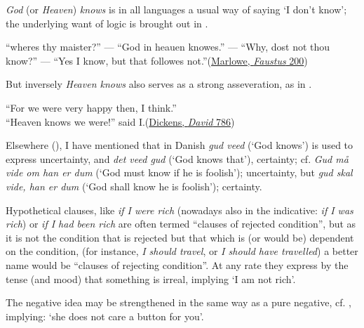 \textit{God} (or \textit{Heaven}) \textit{knows} is in all languages a usual way of saying `I don't know'; the underlying want of logic is brought out in .

\ea \label{ex:04-233}
``wheres thy maister?'' --- ``God in heauen knowes.'' --- ``Why, dost not thou know?'' --- ``Yes I know, but that followes not.''\hfill(\href{https://babel.hathitrust.org/cgi/pt?id=uiuo.ark:/13960/t1pg73v3n&seq=84&q1=wheres+thy+maister}{Marlowe, \textit{Faustus} 200})
\z

But inversely \textit{Heaven knows} also serves as a strong asseveration, as in .

\ea \label{ex:04-234}
``For we were very happy then, I think.''\\``Heaven knows we were!'' said I.\hfill(\href{https://archive.org/details/personalhistory05dickgoog/page/n341/mode/2up?q=\%22we+were+very+happy+then\%22&view=theater}{Dickens, \textit{David} 786}) %
\z

Elsewhere (\cite[\href{https://archive.org/details/maalogminne1910olse/page/n213/mode/2up?q=\%22gud+veed\%22&view=theater}{36}]{jespersen1911ombanden}), I have mentioned that in Danish \textit{gud veed} (`God knows') is used to express uncertainty, and \textit{det veed gud} (`God knows that'), certainty; cf. \textit{Gud må vide om han er dum} (`God must know if he is foolish'); uncertainty, but \textit{gud skal vide, han er dum} (`God shall know he is foolish'); certainty.


 \label{sec:hypothetical}

Hypothetical clauses, like \textit{if I were rich} (nowadays also in the indicative:
\textit{if I was rich}) or \textit{if I had been rich} are often termed ``clauses of rejected condition'', but as it is not the condition that is rejected but that which is (or would be) dependent on the condition, (for instance, \textit{I should travel}, or \textit{I should have travelled}) a better name would be ``clauses of rejecting condition''. At any rate they express by the tense (and mood) that something is irreal, implying `I am not rich'. 

The negative idea may be strengthened in the same way as a pure negative, cf. , implying: `she does not care a button for you'.

